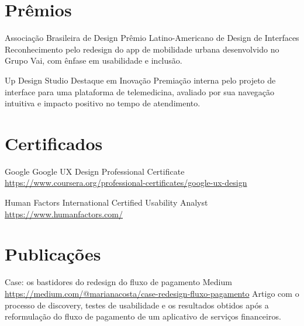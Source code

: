 \documentclass[a4paper, serif, 10pt]{moderncv}
\begin{document}
\section{Prêmios}

        {Associação Brasileira de Design}
        {Prêmio Latino-Americano de Design de Interfaces}
        {}
        {}
        {Reconhecimento pelo redesign do app de mobilidade urbana desenvolvido no Grupo Vai, com ênfase em usabilidade e inclusão.}

        {Up Design Studio}
        {Destaque em Inovação}
        {}
        {}
        {Premiação interna pelo projeto de interface para uma plataforma de telemedicina, avaliado por sua navegação intuitiva e impacto positivo no tempo de atendimento.}
\section{Certificados}

        {Google}
        {Google UX Design Professional Certificate}
        {\url{https://www.coursera.org/professional-certificates/google-ux-design}}
        {}
        {}

        {Human Factors International}
        {Certified Usability Analyst}
        {\url{https://www.humanfactors.com/}}
        {}
        {}
\section{Publicações}

        {Case: os bastidores do redesign do fluxo de pagamento}
        {Medium}
        {\url{https://medium.com/@marianacosta/case-redesign-fluxo-pagamento}}
        {}
        {Artigo com o processo de discovery, testes de usabilidade e os resultados obtidos após a reformulação do fluxo de pagamento de um aplicativo de serviços financeiros.}
\end{document}
